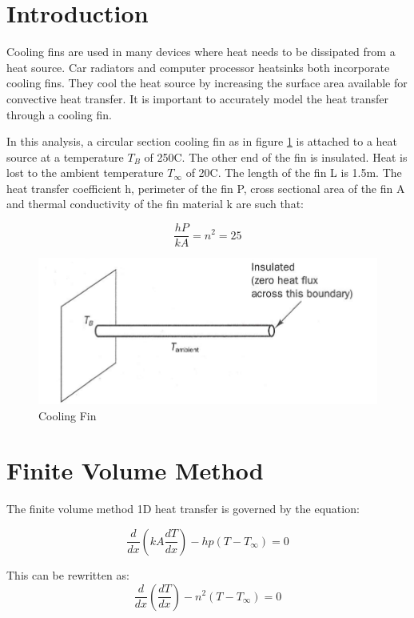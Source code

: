 \documentclass[review]{elsarticle}
\begin{document}
\linenumbers

\printnomenclature
\section{Introduction}

Cooling fins are used in many devices where heat needs to be dissipated from a heat source. Car radiators and computer processor heatsinks both incorporate cooling fins. They cool the heat source by increasing the surface area available for convective heat transfer. It is important to accurately model the heat transfer through a cooling fin.

In this analysis, a circular section cooling fin as in figure \ref{fin} is attached to a heat source at a temperature \(T_{B}\) of 250\degree C. The other end of the fin is insulated. Heat is lost to the ambient temperature \(T_\infty\) of 20\degree C. The length of the fin L is 1.5m.
The heat transfer coefficient h, perimeter of the fin P, cross sectional area of the fin A and thermal conductivity of the fin material k are such that:

\[ \frac{hP}{kA} = n^{2} = 25 \]

\begin{figure}[H]
    \includegraphics[width=\textwidth]{img/cooling_fin.png}
    \caption{Cooling Fin}
    \label{fin}
\end{figure}

\section{Finite Volume Method}
The finite volume method 1D heat transfer is governed by the equation:

\[ \frac{d}{dx} \left(kA \frac{dT}{dx} \right) - hp(T - T_{\infty}) = 0 \]

This can be rewritten as:
\[ \frac{d}{dx} \left(\frac{dT}{dx} \right) - n^2(T - T_{\infty}) = 0 \]
\end{document}
